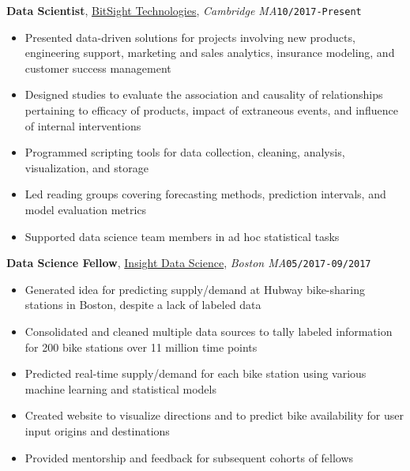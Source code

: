 \documentclass[10pt,english]{article}
\begin{document}
\textbf{Data Scientist}, \textcolor{blue}{\href{https://www.bitsighttech.com}{BitSight Technologies}}, \textit{Cambridge MA}\hfill \texttt{10/2017-Present}
\begin{itemize}
\item Presented data-driven solutions for projects involving new products, engineering support, marketing and sales analytics, insurance modeling, and customer success management
\item Designed studies to evaluate the association and causality of relationships pertaining to efficacy of products, impact of extraneous events, and influence of internal interventions
\item Programmed scripting tools for data collection, cleaning, analysis, visualization, and storage
\item Led reading groups covering forecasting methods, prediction intervals, and model evaluation metrics
\item Supported data science team members in ad hoc statistical tasks
\end{itemize}

\vspace{2mm}

\textbf{Data Science Fellow}, \textcolor{blue}{\href{https://www.insightdatascience.com}{Insight Data Science}}, \textit{Boston MA}\hfill \texttt{05/2017-09/2017}
\begin{itemize}
\item Generated idea for predicting supply/demand at Hubway bike-sharing stations in Boston, despite a lack of labeled data
\item Consolidated and cleaned multiple data sources to tally labeled information for 200 bike stations over 11 million time points
\item Predicted real-time supply/demand for each bike station using various machine learning and statistical models
\item Created website to visualize directions and to predict bike availability for user input origins and destinations
\item Provided mentorship and feedback for subsequent cohorts of fellows
\end{itemize}
\end{document}
